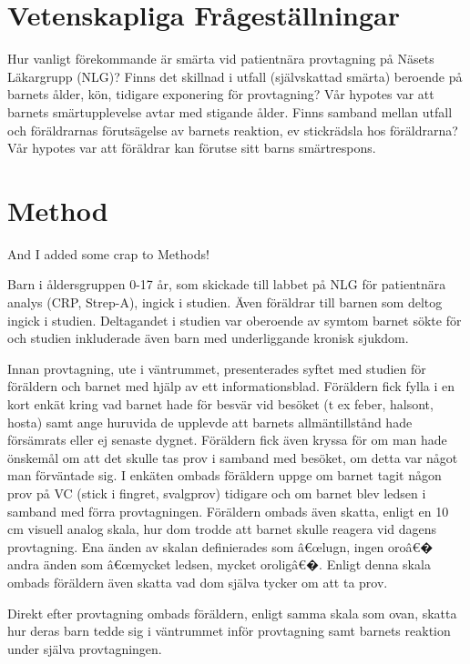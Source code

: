 \documentclass[12pt,twocolumn]{article}
\begin{document}
\section{Vetenskapliga Fr\r{a}gest\"allningar}

Hur vanligt f\"orekommande \"ar sm\"arta vid patientn\"ara provtagning p\r{a}
N\"asets L\"akargrupp (NLG)?
Finns det skillnad i utfall (sj\"alvskattad sm\"arta) beroende p\r{a} barnets
\r{a}lder, k\"on, tidigare exponering f\"or provtagning? V\r{a}r hypotes var att
barnets sm\"artupplevelse avtar med stigande \r{a}lder.
Finns samband mellan utfall och f\"or\"aldrarnas f\"oruts\"agelse av barnets
reaktion, ev stickr\"adsla hos f\"or\"aldrarna? V\r{a}r hypotes var att
f\"or\"aldrar kan f\"orutse sitt barns sm\"artrespons.

\section{Method}

And I added some crap to Methods!


Barn i \r{a}ldersgruppen 0-17 \r{a}r, som skickade till labbet p\r{a} NLG f\"or
patientn\"ara analys (CRP, Strep-A), ingick i studien. \"Aven f\"or\"aldrar till
barnen som deltog ingick i studien. Deltagandet i studien var oberoende av
symtom barnet s\"okte f\"or och studien inkluderade \"aven barn med
underliggande kronisk sjukdom.

Innan provtagning, ute i v\"antrummet, presenterades syftet med studien f\"or
f\"or\"aldern och barnet med hj\"alp av ett informationsblad. F\"or\"aldern fick
fylla i en kort enk\"at kring vad barnet hade f\"or besv\"ar vid bes\"oket (t ex
feber, halsont, hosta) samt ange huruvida de upplevde att barnets
allm\"antillst\r{a}nd hade f\"ors\"amrats eller ej senaste dygnet. F\"or\"aldern
fick \"aven kryssa f\"or om man hade \"onskem\r{a}l om att det skulle tas prov i
samband med bes\"oket, om detta var n\r{a}got man f\"orv\"antade sig. I
enk\"aten ombads f\"or\"aldern uppge om barnet tagit n\r{a}gon prov p\r{a} VC
(stick i fingret, svalgprov) tidigare och om barnet blev ledsen i samband med
f\"orra provtagningen. F\"or\"aldern ombads \"aven skatta, enligt en 10 cm
visuell analog skala, hur dom trodde att barnet skulle reagera vid dagens
provtagning.
Ena \"anden av skalan definierades som â€œlugn, ingen oroâ€� andra \"anden som
â€œmycket ledsen, mycket oroligâ€�. Enligt denna skala ombads f\"or\"aldern \"aven
skatta vad dom sj\"alva tycker om att ta prov.

Direkt efter provtagning ombads f\"or\"aldern, enligt samma skala som ovan,
skatta hur deras barn tedde sig i v\"antrummet inf\"or provtagning samt barnets
reaktion under sj\"alva provtagningen.
\end{document}

